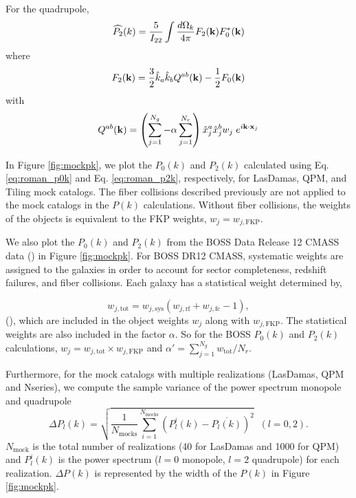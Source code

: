 \documentclass{emulateapj}
\begin{document}
For the quadrupole, 
\begin{equation}\label{eq:roman_p2k}
\widehat{P_2}(k) = \frac{5}{I_{22}} \int \frac{d\Omega_k}{4 \pi} F_2({\bf k}) F_0^*({\bf k})
\end{equation}
where 
\begin{equation}
F_2({\bf k}) = \frac{3}{2}\hat{k}_a\hat{k}_b Q^{ab}({\bf k}) - \frac{1}{2} F_0({\bf k})
\end{equation}
with 
\begin{equation}
Q^{ab}({\bf k}) = \left( \sum_{j = 1}^{N_g} - \alpha \sum_{j=1}^{N_r} \right) \hat{x}_j^a\hat{x}_j^b w_j \;e^{i {\bf k}\cdot{\bf x}_j}
\end{equation}

In Figure \ref{fig:mockpk}, we plot the $P_0(k)$ and $P_2(k)$ calculated using Eq. \ref{eq:roman_p0k} and Eq. \ref{eq:roman_p2k}, respectively, for LasDamas, QPM, and Tiling mock catalogs. The fiber collisions described previously are not applied to the mock catalogs in the $P(k)$ calculations. Without fiber collisions, the weights of the objects is equivalent to the FKP weights, $w_j = w_{j,\mathrm{FKP}}$. 

We also plot the $P_0(k)$ and $P_2(k)$ from the BOSS Data Release 12 CMASS data (\cmasscolor) in Figure \ref{fig:mockpk}. For BOSS DR12 CMASS, systematic weights are assigned to the galaxies in order to account for sector completeness, redshift failures, and fiber collisions. Each galaxy has a statistical weight determined by, 

\begin{equation} \label{eq:weight}
w_{j, \mathrm{tot}} = w_{j, \mathrm{sys}} (w_{j, \mathrm{rf}} + w_{j, \mathrm{fc}} -1), 
\end{equation} 
(\citealt{Anderson:2012aa, Beutler:2014aa}), which are included in the object weights $w_j$ along with $w_{j, \mathrm{FKP}}$. The statistical weights are also included in the factor $\alpha$. So for the BOSS $P_0(k)$ and $P_2(k)$ calculations, $w_j = w_{j, \mathrm{tot}} \times w_{j, \mathrm{FKP}}$ and $\alpha' = \sum_{j=1}^{N_g} w_\mathrm{tot} / N_r$. 

Furthermore, for the mock catalogs with multiple realizations (LasDamas, QPM and Nseries), we compute the sample variance of the power spectrum monopole and quadrupole
\begin{equation} \label{eq:pk_var}
\Delta P_l (k)= \sqrt{\frac{1}{N_\mathrm{mocks}} \sum\limits_{i=1}^{N_\mathrm{mocks}} (P^i_l(k)- \overline{P_l(k)})^2 }\;\; (l= 0, 2). 
\end{equation}
$N_\mathrm{mock}$ is the total number of realizations (40 for LasDamas and 1000 for QPM) and $P^i_l(k)$ is the power spectrum ($l=0$ monopole, $l=2$ quadrupole) for each realization. $\Delta P(k)$ is represented by the width of the $P(k)$ in Figure \ref{fig:mockpk}. 
\end{document}
